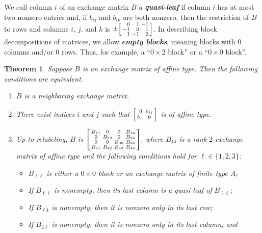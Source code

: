 \documentclass{amsart}
\newtheorem{theorem}[proposition]{Theorem}
\theoremstyle{definition}
\theoremstyle{remark}
\numberwithin{equation}{section}
\newcommand{\newword}[1]{\textbf{\emph{#1}}}
\newcommand{\set}[1]{{\lbrace #1 \rbrace}}
\newcommand{\0}{{\mathbf{0}}}
\renewcommand{\b}{\mathbf{b}}
\begin{document}
We call column $i$ of an exchange matrix $B$ a \newword{quasi-leaf} if column $i$ has at most two nonzero entries and, if $b_{ij}$ and $b_{ik}$ are both nonzero, then the restriction of $B$ to rows and columns $i$, $j$, and $k$ is $\pm\begin{bsmallmatrix*}[r]0&1&-1\\-1&0&1\\1&-1&0\end{bsmallmatrix*}$.
In describing block decompositions of matrices, we allow \newword{empty blocks}, meaning blocks with $0$ columns and/or $0$ rows.
Thus, for example, a ``$0\times 2$ block'' or a ``$0\times 0$ block''.

\begin{theorem}\label{neigh B}
Suppose $B$ is an exchange matrix of affine type.
Then the following conditions are equivalent.
\begin{enumerate}[\quad\rm(i)]
\item \label{neigh}
$B$ is a neighboring exchange matrix.
\item \label{aff 2}
There exist indices $i$ and $j$ such that $\begin{bsmallmatrix}0&b_{ij}\\b_{ji}&0\end{bsmallmatrix}$ is of affine type.
\item \label{neigh detailed}
Up to relabeling, $B$ is
    $
      \begin{bsmallmatrix}
        B_{11} 	& 0 		& 0 		& B_{14} \\ 
        0 		& B_{22} 	& 0 		& B_{24} \\
        0 		& 0 		& B_{33} 	& B_{34} \\
        B_{41} 	& B_{42} 	& B_{43} 	& B_{44}
      \end{bsmallmatrix},
    $ 
where $B_{44}$ is a rank-$2$ exchange matrix of affine type and the following conditions hold for ${\ell\in\set{1,2,3}}$:
\begin{itemize}
\item
$B_{\ell\ell}$ is either a $0\times0$ block or an exchange matrix of finite type A; %
\item
If $B_{\ell\ell}$ is nonempty, then its last column is a quasi-leaf of $B_{\ell\ell}$;
\item
If $B_{\ell4}$ is nonempty, then it is nonzero only in its last row;
\item
If $B_{4\ell}$ is nonempty, then it is nonzero only in its last column; and

\end{itemize}
\end{enumerate}
\end{theorem}
\end{document}
